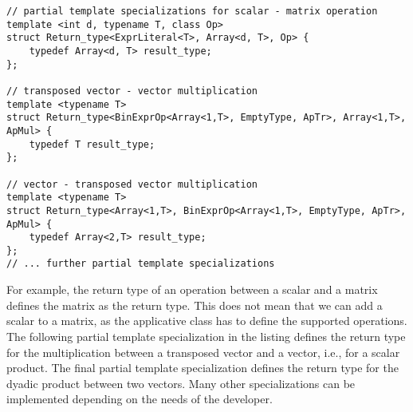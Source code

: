 \documentclass[11pt]{article}
\newcommand{\code}[1]{{\footnotesize\ttfamily{#1}}}
\begin{document}
\begin{lstlisting}[caption={\code{Return\_type} metaprogram}, label=lst:Return_type]
// partial template specializations for scalar - matrix operation
template <int d, typename T, class Op>
struct Return_type<ExprLiteral<T>, Array<d, T>, Op> {
    typedef Array<d, T> result_type;
};

// transposed vector - vector multiplication
template <typename T>
struct Return_type<BinExprOp<Array<1,T>, EmptyType, ApTr>, Array<1,T>, ApMul> {
    typedef T result_type;
};

// vector - transposed vector multiplication
template <typename T>
struct Return_type<Array<1,T>, BinExprOp<Array<1,T>, EmptyType, ApTr>, ApMul> {
    typedef Array<2,T> result_type;
};
// ... further partial template specializations
\end{lstlisting}
For example, the return type of an operation between a scalar and a matrix defines the matrix as the return type. This does not mean that we can add a scalar to a matrix, as the applicative class has to define the supported operations. The following partial template specialization in the listing defines the return type for the multiplication between a transposed vector and a vector, i.e., for a scalar product. The final partial template specialization defines the return type for the dyadic product between two vectors. Many other specializations can be implemented depending on the needs of the developer.
\end{document}
